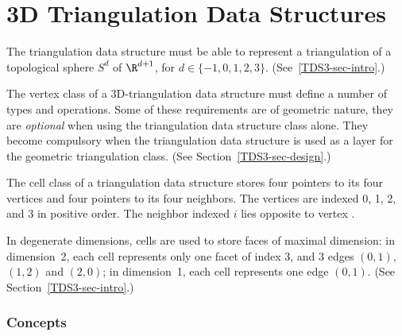 \chapter{3D Triangulation Data Structures}

The triangulation data structure must be able to represent a
triangulation of a topological sphere $S^d$ of $\R^{d+1}$, for 
$d \in \{-1,0,1,2,3\}$. (See~\ref{TDS3-sec-intro}.)

The vertex class of a 3D-triangulation data structure must define
a number of types and operations. Some of these
requirements are of geometric nature, they are \textit{optional}
when using the triangulation data structure class alone. They become
compulsory when the triangulation data structure is used as a layer
for the geometric triangulation class. (See Section~\ref{TDS3-sec-design}.)

The cell class of a triangulation data structure stores
four pointers to its four vertices and four pointers to its four
neighbors. The vertices are indexed 0, 1, 2, and 3 in positive order.
The neighbor indexed $i$ lies opposite to vertex .

In degenerate dimensions, cells are used to store faces of maximal
dimension: in dimension~2, each cell represents only one
facet of index 3, and 3 edges $(0,1)$, $(1,2)$ and $(2,0)$; in
dimension~1, each cell represents one edge $(0,1)$. (See 
Section~\ref{TDS3-sec-intro}.) 

\subsection*{Concepts}


